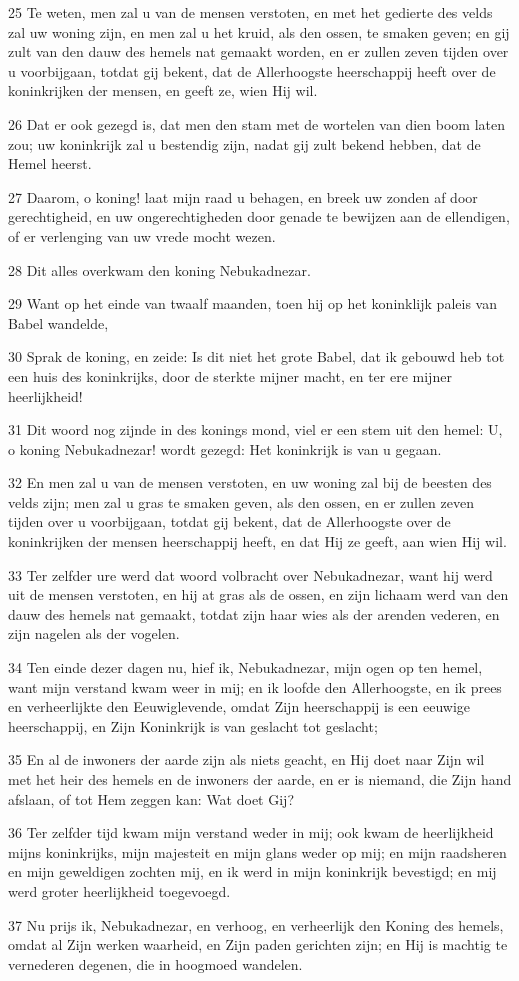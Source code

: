 \par 25 Te weten, men zal u van de mensen verstoten, en met het gedierte des velds zal uw woning zijn, en men zal u het kruid, als den ossen, te smaken geven; en gij zult van den dauw des hemels nat gemaakt worden, en er zullen zeven tijden over u voorbijgaan, totdat gij bekent, dat de Allerhoogste heerschappij heeft over de koninkrijken der mensen, en geeft ze, wien Hij wil.
\par 26 Dat er ook gezegd is, dat men den stam met de wortelen van dien boom laten zou; uw koninkrijk zal u bestendig zijn, nadat gij zult bekend hebben, dat de Hemel heerst.
\par 27 Daarom, o koning! laat mijn raad u behagen, en breek uw zonden af door gerechtigheid, en uw ongerechtigheden door genade te bewijzen aan de ellendigen, of er verlenging van uw vrede mocht wezen.
\par 28 Dit alles overkwam den koning Nebukadnezar.
\par 29 Want op het einde van twaalf maanden, toen hij op het koninklijk paleis van Babel wandelde,
\par 30 Sprak de koning, en zeide: Is dit niet het grote Babel, dat ik gebouwd heb tot een huis des koninkrijks, door de sterkte mijner macht, en ter ere mijner heerlijkheid!
\par 31 Dit woord nog zijnde in des konings mond, viel er een stem uit den hemel: U, o koning Nebukadnezar! wordt gezegd: Het koninkrijk is van u gegaan.
\par 32 En men zal u van de mensen verstoten, en uw woning zal bij de beesten des velds zijn; men zal u gras te smaken geven, als den ossen, en er zullen zeven tijden over u voorbijgaan, totdat gij bekent, dat de Allerhoogste over de koninkrijken der mensen heerschappij heeft, en dat Hij ze geeft, aan wien Hij wil.
\par 33 Ter zelfder ure werd dat woord volbracht over Nebukadnezar, want hij werd uit de mensen verstoten, en hij at gras als de ossen, en zijn lichaam werd van den dauw des hemels nat gemaakt, totdat zijn haar wies als der arenden vederen, en zijn nagelen als der vogelen.
\par 34 Ten einde dezer dagen nu, hief ik, Nebukadnezar, mijn ogen op ten hemel, want mijn verstand kwam weer in mij; en ik loofde den Allerhoogste, en ik prees en verheerlijkte den Eeuwiglevende, omdat Zijn heerschappij is een eeuwige heerschappij, en Zijn Koninkrijk is van geslacht tot geslacht;
\par 35 En al de inwoners der aarde zijn als niets geacht, en Hij doet naar Zijn wil met het heir des hemels en de inwoners der aarde, en er is niemand, die Zijn hand afslaan, of tot Hem zeggen kan: Wat doet Gij?
\par 36 Ter zelfder tijd kwam mijn verstand weder in mij; ook kwam de heerlijkheid mijns koninkrijks, mijn majesteit en mijn glans weder op mij; en mijn raadsheren en mijn geweldigen zochten mij, en ik werd in mijn koninkrijk bevestigd; en mij werd groter heerlijkheid toegevoegd.
\par 37 Nu prijs ik, Nebukadnezar, en verhoog, en verheerlijk den Koning des hemels, omdat al Zijn werken waarheid, en Zijn paden gerichten zijn; en Hij is machtig te vernederen degenen, die in hoogmoed wandelen.

